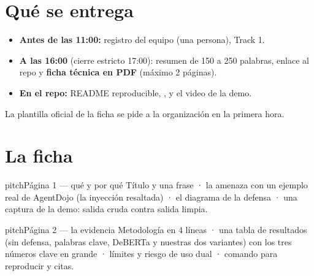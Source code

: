 
\section{Qué se entrega}
\begin{itemize}
  \item \textbf{Antes de las 11:00:} registro del equipo (una persona), Track 1.
  \item \textbf{A las 16:00} (cierre estricto 17:00): resumen de 150 a 250 palabras, enlace al repo y \textbf{ficha técnica en PDF} (máximo 2 páginas).
  \item \textbf{En el repo:} README reproducible, ,  y el video de la demo.
\end{itemize}
La plantilla oficial de la ficha se pide a la organización en la primera hora.

\section{La ficha}
\begin{card}{pitch}{Página 1 — qué y por qué}
Título y una frase · la amenaza con un ejemplo real de AgentDojo (la inyección resaltada) · el diagrama de la defensa · una captura de la demo: salida cruda contra salida limpia.
\end{card}
\begin{card}{pitch}{Página 2 — la evidencia}
Metodología en 4 líneas · una tabla de resultados (sin defensa, palabras clave, DeBERTa y nuestras dos variantes) con los tres números clave en grande · límites y riesgo de uso dual · comando para reproducir y citas.
\end{card}

